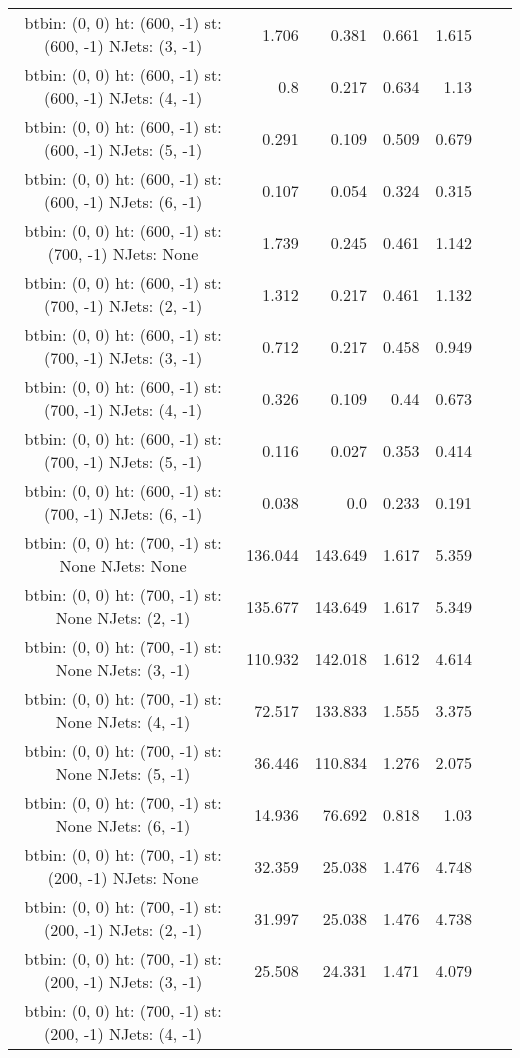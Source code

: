 \documentclass[12pt]{paper}
\begin{document}
\begin{landscape}
\begin{longtable}{c|r|r|r|r|r|r}
btbin:  (0, 0) ht:  (600, -1) st:  (600, -1) NJets:  (3, -1)
 & 1.706 & 0.381 & 0.661 & 1.615\\
btbin:  (0, 0) ht:  (600, -1) st:  (600, -1) NJets:  (4, -1)
 & 0.8 & 0.217 & 0.634 & 1.13\\
btbin:  (0, 0) ht:  (600, -1) st:  (600, -1) NJets:  (5, -1)
 & 0.291 & 0.109 & 0.509 & 0.679\\
btbin:  (0, 0) ht:  (600, -1) st:  (600, -1) NJets:  (6, -1)
 & 0.107 & 0.054 & 0.324 & 0.315\\
btbin:  (0, 0) ht:  (600, -1) st:  (700, -1) NJets:  None
 & 1.739 & 0.245 & 0.461 & 1.142\\
btbin:  (0, 0) ht:  (600, -1) st:  (700, -1) NJets:  (2, -1)
 & 1.312 & 0.217 & 0.461 & 1.132\\
btbin:  (0, 0) ht:  (600, -1) st:  (700, -1) NJets:  (3, -1)
 & 0.712 & 0.217 & 0.458 & 0.949\\
btbin:  (0, 0) ht:  (600, -1) st:  (700, -1) NJets:  (4, -1)
 & 0.326 & 0.109 & 0.44 & 0.673\\
btbin:  (0, 0) ht:  (600, -1) st:  (700, -1) NJets:  (5, -1)
 & 0.116 & 0.027 & 0.353 & 0.414\\
btbin:  (0, 0) ht:  (600, -1) st:  (700, -1) NJets:  (6, -1)
 & 0.038 & 0.0 & 0.233 & 0.191\\
btbin:  (0, 0) ht:  (700, -1) st:  None NJets:  None
 & 136.044 & 143.649 & 1.617 & 5.359\\
btbin:  (0, 0) ht:  (700, -1) st:  None NJets:  (2, -1)
 & 135.677 & 143.649 & 1.617 & 5.349\\
btbin:  (0, 0) ht:  (700, -1) st:  None NJets:  (3, -1)
 & 110.932 & 142.018 & 1.612 & 4.614\\
btbin:  (0, 0) ht:  (700, -1) st:  None NJets:  (4, -1)
 & 72.517 & 133.833 & 1.555 & 3.375\\
btbin:  (0, 0) ht:  (700, -1) st:  None NJets:  (5, -1)
 & 36.446 & 110.834 & 1.276 & 2.075\\
btbin:  (0, 0) ht:  (700, -1) st:  None NJets:  (6, -1)
 & 14.936 & 76.692 & 0.818 & 1.03\\
btbin:  (0, 0) ht:  (700, -1) st:  (200, -1) NJets:  None
 & 32.359 & 25.038 & 1.476 & 4.748\\
btbin:  (0, 0) ht:  (700, -1) st:  (200, -1) NJets:  (2, -1)
 & 31.997 & 25.038 & 1.476 & 4.738\\
btbin:  (0, 0) ht:  (700, -1) st:  (200, -1) NJets:  (3, -1)
 & 25.508 & 24.331 & 1.471 & 4.079\\
btbin:  (0, 0) ht:  (700, -1) st:  (200, -1) NJets:  (4, -1)

\end{longtable}
\end{landscape}
\end{document}
